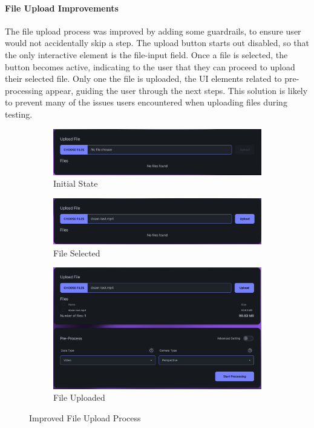 \paragraph{File Upload Improvements}
The file upload process was improved by adding some guardrails, to ensure user would not accidentally skip a step.
The upload button starts out disabled, so that the only interactive element is the file-input field.
Once a file is selected, the button becomes active, indicating to the user that they can proceed to upload their selected file.
Only one the file is uploaded, the UI elements related to pre-processing appear, guiding the user through the next steps.
This solution is likely to prevent many of the issues users encountered when uploading files during testing. 


\begin{figure}[htb]
  \begin{subfigure}{\textwidth}
    \centering
    \includegraphics[width=.8\linewidth]{figures/fix-4.1.png}
    \caption{Initial State}
  \end{subfigure}
  \begin{subfigure}{\textwidth}
    \centering
    \includegraphics[width=.8\linewidth]{figures/fix-4.2.png}
    \caption{File Selected}
  \end{subfigure}
  \begin{subfigure}{\textwidth}
    \centering
    \includegraphics[width=.8\linewidth]{figures/fix-4.3.png}
    \caption{File Uploaded}
  \end{subfigure}
	\caption{Improved File Upload Process}
  \label{fig:fix-4}
\end{figure}
